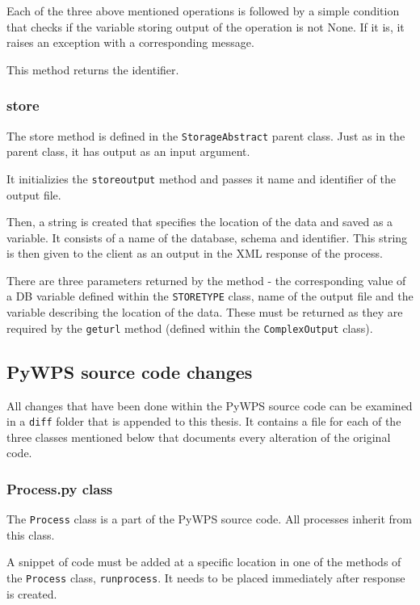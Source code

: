 Each of the three above mentioned operations is followed by a simple condition that checks if the variable storing output of the operation is not None. If it is, it raises an exception with a corresponding message.

This method returns the identifier.


\subsubsection{store} 

The store method is defined in the \texttt{StorageAbstract} parent class. Just as in the parent class, it has output as an input argument.

It initializies the \texttt{\textunderscore  store\textunderscore output} method and passes it name and identifier of the output file. 

Then, a string is created that specifies the location of the data and saved as a variable. It consists of a name of the database, schema and identifier. This string is then given to the client as an output in the XML response of the process.

There are three parameters returned by the method - the corresponding value of a DB variable defined within the \texttt{STORE\textunderscore TYPE} class, name of the output file and the variable describing the location of the data. These must be returned as they are required by the \texttt{get\textunderscore url} method (defined within the \texttt{ComplexOutput} class). 


\subsection{PyWPS source code changes} 

All changes that have been done within the PyWPS source code can be examined in a \texttt{diff} folder that is appended to this thesis. It contains a file for each of the three classes mentioned below that documents every alteration of the original code.

\subsubsection{Process.py class} 

The \texttt{Process} class is a part of the PyWPS source code. All processes inherit from this class. 

A snippet of code must be added at a specific location in one of the methods of the \texttt{Process} class, \texttt{\textunderscore run\textunderscore process}. It needs to be placed immediately after response is created.

